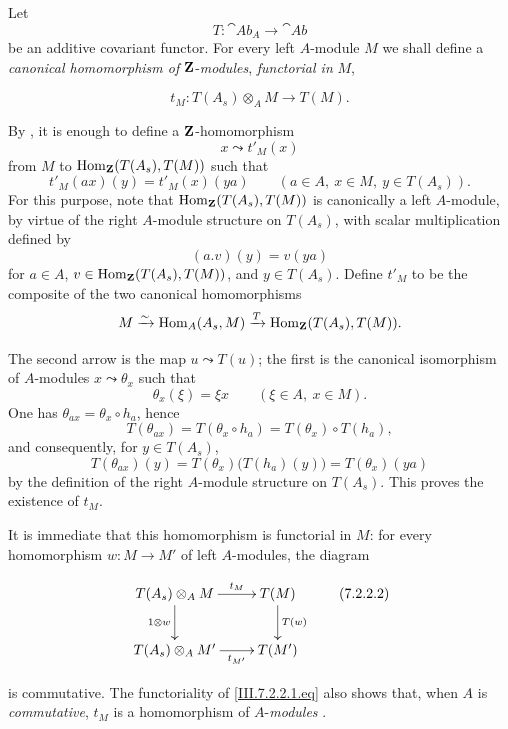 \begin{env}[7.2.2]
\label{III.7.2.2}
Let
\[
  T:\cat{Ab}_A\longrightarrow\cat{Ab}
\]
be an additive covariant functor.  For every left $A$-module
$M$ we shall define a \emph{canonical homomorphism of} $\mathbf{Z}$-\emph{modules},
\emph{functorial in} $M$,
\begin{env}[7.2.2.1]
\label{III.7.2.2.1}
\[
  t_M:T(A_s)\otimes_A M\longrightarrow T(M).
  \tag{7.2.2.1}\label{III.7.2.2.1.eq}
\]
\end{env}
By , it is enough to define a
$\mathbf{Z}$-homomorphism
\[
  x\leadsto t'_M(x)
\]
from $M$ to $\operatorname{Hom}_{\mathbf{Z}}(T(A_s),T(M))$ such that
\[
  t'_M(ax)(y)=t'_M(x)(ya)
  \qquad(a\in A,\ x\in M,\ y\in T(A_s)).
\]
For this purpose, note that
$\operatorname{Hom}_{\mathbf{Z}}(T(A_s),T(M))$ is canonically a left $A$-module,
by virtue of the right $A$-module structure on $T(A_s)$, with
scalar multiplication defined by
\[
  (a.v)(y)=v(ya)
\]
for $a\in A$, $v\in\operatorname{Hom}_{\mathbf{Z}}(T(A_s),T(M))$, and
$y\in T(A_s)$.  Define $t'_M$ to be the composite of the two
canonical homomorphisms
\[
  M
  \xrightarrow{\sim}
  \operatorname{Hom}_A(A_s,M)
  \xrightarrow{T}
  \operatorname{Hom}_{\mathbf{Z}}(T(A_s),T(M)).
\]

The second arrow is the map $u\leadsto T(u)$; the first is the canonical
isomorphism of $A$-modules $x\leadsto\theta_x$ such that
\[
  \theta_x(\xi)=\xi x
  \qquad(\xi\in A,\ x\in M).
\]
One has $\theta_{ax}=\theta_x\circ h_a$, hence
\[
  T(\theta_{ax})
  =
  T(\theta_x\circ h_a)
  =
  T(\theta_x)\circ T(h_a),
\]
and consequently, for $y\in T(A_s)$,
\[
  T(\theta_{ax})(y)
  =
  T(\theta_x)\bigl(T(h_a)(y)\bigr)
  =
  T(\theta_x)(ya)
\]
by the definition of the right $A$-module structure on
$T(A_s)$.  This proves the existence of $t_M$.

It is immediate that this homomorphism is functorial in $M$:
for every homomorphism $w:M\to M'$ of left $A$-modules, the
diagram
\begin{env}[7.2.2.2]
\label{III.7.2.2.2}
\[
\xymatrix{
  T(A_s)\otimes_A M
    \ar[r]^-{t_M}\ar[d]_{1\otimes w}
  & T(M)\ar[d]^{T(w)}
  \\
  T(A_s)\otimes_A M'
    \ar[r]_-{t_{M'}}
  & T(M')
}
\tag{7.2.2.2}\label{III.7.2.2.2.eq}
\]
\end{env}
is commutative.  The functoriality of
\eqref{III.7.2.2.1.eq} also shows that, when $A$ is
\emph{commutative}, $t_M$ is a homomorphism of $A$-\emph{modules}
.
\end{env}

